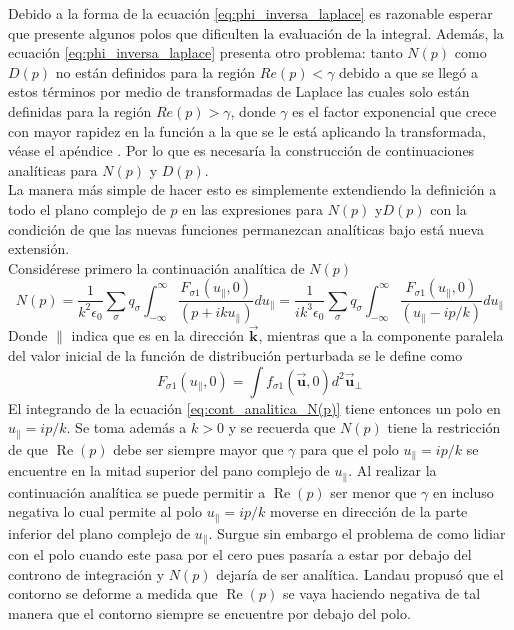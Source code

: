 \documentclass[../tesis_main_file.tex]{subfile}
\begin{document}
Debido a la forma de la ecuación \ref{eq:phi_inversa_laplace} es razonable esperar que presente algunos polos que dificulten la evaluación de la integral. Además, la ecuación \ref{eq:phi_inversa_laplace} presenta otro problema: tanto $N(p)$ como $D(p)$ no están definidos para la región $Re(p) < \gamma$ debido a que se llegó a estos términos por medio de transformadas de Laplace las cuales solo están definidas para la región $Re(p) > \gamma$, donde $\gamma$ es el factor exponencial que crece con mayor rapidez en la función a la que se le está aplicando la transformada, véase el apéndice \notinsubfile{\ref{Ap:Laplace}}. Por lo que es necesaría la construcción de continuaciones analíticas para $N(p)$ y $D(p)$.\\
La manera más simple de hacer esto es simplemente extendiendo la definición a todo el plano complejo de $p$ en las expresiones para $N(p)$ y$D(p)$ con la condición de que las nuevas funciones permanezcan analíticas bajo está nueva extensión.\\
Considérese primero la continuación analítica de $N(p)$
\begin{equation}
\label{eq:cont_analitica_N(p)}
N(p) = \frac{1}{k^2 \epsilon_0}\sum_{\sigma}q_{\sigma}\int ^{\infty}_{-\infty}\frac{F_{\sigma 1}(u_{\parallel},0)}{(p +iku_{\parallel})}du_{\parallel}=\frac{1}{ik^3 \epsilon_0}\sum_{\sigma}q_{\sigma}\int ^{\infty}_{-\infty}\frac{F_{\sigma 1}(u_{\parallel},0)}{(u_{\parallel} -ip/k)}du_{\parallel}
\end{equation}
Donde $\parallel$ indica que es en la dirección $\overrightarrow{\textbf{k}}$, mientras que a la componente paralela del valor inicial de la función de distribución perturbada se le define como
\begin{equation}
F_{\sigma 1}(u_{\parallel},0)=\int f_{\sigma 1}(\overrightarrow{\textbf{u}},0)d^2\overrightarrow{\textbf{u}}_{\perp}
\end{equation}
El integrando de la ecuación \ref{eq:cont_analitica_N(p)} tiene entonces un polo en $u_{\parallel}=ip/k$. Se toma además a $k>0$ y se recuerda que $N(p)$ tiene la restricción de que $\operatorname{Re}(p)$ debe ser siempre mayor que $\gamma$ para que el polo $u_{\parallel}=ip/k$ se encuentre en la mitad superior del pano complejo de $u_{\parallel}$. Al realizar la continuación analítica se puede permitir a $\operatorname{Re}(p)$ ser menor que $\gamma$ en incluso negativa lo cual permite al polo $u_{\parallel}=ip/k$ moverse en dirección de la parte inferior del plano complejo de $u_{\parallel}$. Surgue sin embargo el problema de como lidiar con el polo cuando este pasa por el cero pues pasaría a estar por debajo del controno de integración y $N(p)$ dejaría de ser analítica. Landau propusó que el contorno se deforme a medida que $\operatorname{Re}(p)$ se vaya haciendo negativa de tal manera que el contorno siempre se encuentre por debajo del polo.\cite{bellan2008fundamentals}\\
\end{document}
